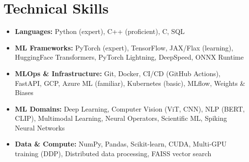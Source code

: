 \documentclass[10.5pt, a4paper]{article}
\newcommand{\resumeItem}[1]{\item[\textbullet] #1}
\newcommand{\skillLine}[2]{\textbf{#1:} #2}
\begin{document}
\section{Technical Skills}
\begin{itemize}[leftmargin=-1pt, itemsep=1pt, topsep=-2pt, parsep=0pt]
    \item \skillLine{Languages}{Python (expert), C++ (proficient), C, SQL}
    \item \skillLine{ML Frameworks}{PyTorch (expert), TensorFlow, JAX/Flax (learning), HuggingFace Transformers, PyTorch Lightning, DeepSpeed, ONNX Runtime}
    \item \skillLine{MLOps \& Infrastructure}{Git, Docker, CI/CD (GitHub Actions), FastAPI, GCP, Azure ML (familiar), Kubernetes (basic), MLflow, Weights \& Biases}
    \item \skillLine{ML Domains}{Deep Learning, Computer Vision (ViT, CNN), NLP (BERT, CLIP), Multimodal Learning, Neural Operators, Scientific ML, Spiking Neural Networks}
    \item \skillLine{Data \& Compute}{NumPy, Pandas, Scikit-learn, CUDA, Multi-GPU training (DDP), Distributed data processing, FAISS vector search}
\end{itemize}

\end{document}
